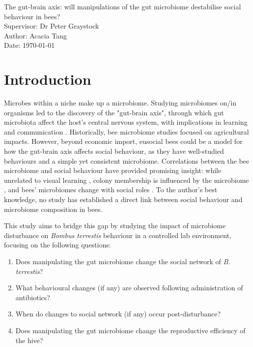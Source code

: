 \documentclass[11pt]{article} %
\begin{document}
    \begin{titlepage}\centering
    \vspace*{\fill}
    \LARGE The gut-brain axis: will manipulations of the gut microbiome destabilise social behaviour in bees?\\
    \vspace{\baselineskip}
    \LARGE Supervisor: Dr Peter Graystock\\
    \vspace{\baselineskip}
    \normalsize Author: Acacia Tang\\
    \normalsize Date: {\today}
    \vspace*{\fill}
    \end{titlepage}

    \newpage
    \section{Introduction}
        Microbes within a niche make up a microbiome.
        Studying microbiomes on/in organisms led to the discovery of the "gut-brain axis",
        through which gut microbiota affect the host's central nervous system,
        with implications in learning and communication
        \parencite{archie2015social}.
        Historically, bee microbiome studies focused on agricultural impacts.
        However, beyond economic import,
        eusocial bees could be a model for how the gut-brain axis affects social behaviour,
        as they have well-studied behaviours and a simple yet consistent microbiome.
        Correlations between the bee microbiome and social behaviour have provided promising insight:
        while unrelated to visual learning
        \parencite{leger2020gut},
        colony membership is influenced by the microbiome
        \parencite{vernier2020gut},
        and bees' microbiomes change with social roles
        \parencite{jones2018gut}.
        To the author's best knowledge, no study has established a direct link between social behaviour and microbiome composition in bees.
      
        This study aims to bridge this gap by studying the impact of microbiome disturbance on \textit{Bombus terrestis} behaviour in a controlled lab environment,
        focusing on the following questions:
        \begin{enumerate}
        \itemsep -0.6ex
            \item Does manipulating the gut microbiome change the social network of \textit{B. terrestis}?
            \item What behavioural changes (if any) are observed following administration of antibiotics?
            \item When do changes to social network (if any) occur post-disturbance?
            \item Does manipulating the gut microbiome change the reproductive efficiency of the hive?
        \end{enumerate}
 
\end{document}
